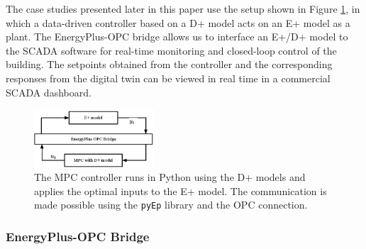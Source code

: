 
The case studies presented later in this paper use the setup shown in Figure \ref{F:control}, in which a data-driven controller based on a D+ model acts on an E+ model as a plant.
The EnergyPlus-OPC bridge allows us to interface an E+/D+ model to the SCADA software for real-time monitoring and closed-loop control of the building.
The setpoints obtained from the controller and the corresponding responses from the digital twin can be viewed in real time in a commercial SCADA dashboard.

\begin{figure}[t]
	\centering
	\includegraphics[width=0.4\textwidth]{images/control.eps}
	\caption{The MPC controller runs in Python using the D+ models and applies the optimal inputs to the E+ model. The communication is made possible using the \texttt{pyEp} library and the OPC connection.}
	\label{F:control}
\end{figure}

\subsubsection{EnergyPlus-OPC Bridge}

